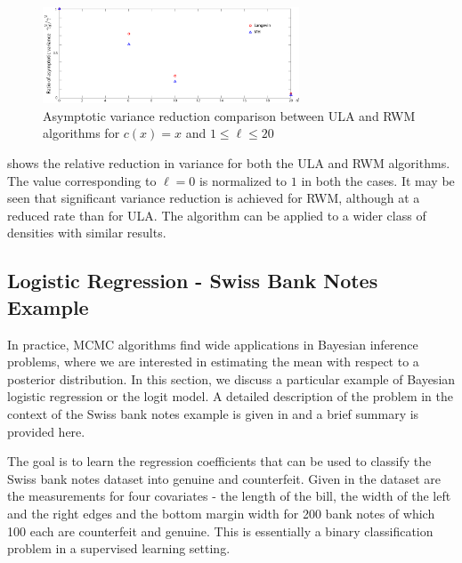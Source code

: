 \begin{figure}[htbp]
	\centering
		\includegraphics[width=3in]{images/Chap5_rel_red_lang_mh_all}
\caption{Asymptotic variance reduction comparison between ULA and RWM algorithms for $c(x) =x$ and $1\leq \ell \leq 20$}
\label{fig:mcmc_ula_rwm_asy_var}
\end{figure}
 shows the relative reduction in variance for both the ULA and RWM algorithms. The value corresponding to $\ell = 0$ is normalized to $1$ in both the cases. It may be seen that significant variance reduction is achieved for RWM, although at a reduced rate than for ULA. The algorithm can be applied to a wider class of densities with similar results. %

\subsection{Logistic Regression - Swiss Bank Notes Example}
In practice, MCMC algorithms find wide applications in Bayesian inference problems, where we are interested in estimating the mean with respect to a posterior distribution. In this section, we discuss a particular example of Bayesian logistic regression or the logit model. A detailed description of the problem in the context of the Swiss bank notes example is given in \cite{papmirgir14} and a brief summary is provided here.

The goal is to learn the regression coefficients that can be used to classify the Swiss bank notes dataset into genuine and counterfeit. Given in the dataset are the measurements for four covariates - the length of the bill, the width of the left and the right edges and the bottom margin width for 200 bank notes of which 100 each are counterfeit and genuine. This is essentially a binary classification problem in a supervised learning setting. 

